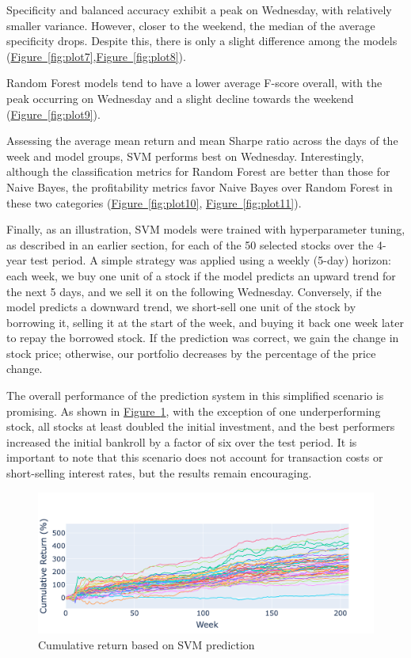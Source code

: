 \documentclass[aodsor,preprint]{imsart}
\numberwithin{equation}{section}
\theoremstyle{plain}
\begin{document}
Specificity and balanced accuracy exhibit a peak on Wednesday, with relatively smaller variance. However, closer to the weekend, the median of the average specificity drops. Despite this, there is only a slight difference among the models (\hyperref[fig:plot7]{Figure~\ref*{fig:plot7}},\hyperref[fig:plot8]{Figure~\ref*{fig:plot8}}).

Random Forest models tend to have a lower average F-score overall, with the peak occurring on Wednesday and a slight decline towards the weekend (\hyperref[fig:plot9]{Figure~\ref*{fig:plot9}}).

Assessing the average mean return and mean Sharpe ratio across the days of the week and model groups, SVM performs best on Wednesday. Interestingly, although the classification metrics for Random Forest are better than those for Naive Bayes, the profitability metrics favor Naive Bayes over Random Forest in these two categories (\hyperref[fig:plot10]{Figure~\ref*{fig:plot10}}, \hyperref[fig:plot11]{Figure~\ref*{fig:plot11}}).

Finally, as an illustration, SVM models were trained with hyperparameter tuning, as described in an earlier section, for each of the 50 selected stocks over the 4-year test period. A simple strategy was applied using a weekly (5-day) horizon: each week, we buy one unit of a stock if the model predicts an upward trend for the next 5 days, and we sell it on the following Wednesday. Conversely, if the model predicts a downward trend, we short-sell one unit of the stock by borrowing it, selling it at the start of the week, and buying it back one week later to repay the borrowed stock. If the prediction was correct, we gain the change in stock price; otherwise, our portfolio decreases by the percentage of the price change.

The overall performance of the prediction system in this simplified scenario is promising. As shown in \hyperref[fig:svm_performance]{Figure~\ref*{fig:svm_performance}}, with the exception of one underperforming stock, all stocks at least doubled the initial investment, and the best performers increased the initial bankroll by a factor of six over the test period. It is important to note that this scenario does not account for transaction costs or short-selling interest rates, but the results remain encouraging.

\begin{figure}[H]
  \centering
  \includegraphics[width=\textwidth]{plots/performance.png}
  \caption{Cumulative return based on SVM prediction}
  \label{fig:svm_performance}
\end{figure}
\end{document}
